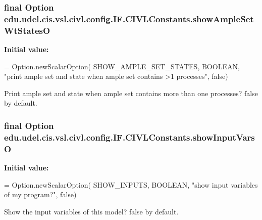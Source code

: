 \subsubsection[{show\+Ample\+Set\+Wt\+States\+O}]{\setlength{\rightskip}{0pt plus 5cm}final Option edu.\+udel.\+cis.\+vsl.\+civl.\+config.\+I\+F.\+C\+I\+V\+L\+Constants.\+show\+Ample\+Set\+Wt\+States\+O\hspace{0.3cm}{\ttfamily [static]}}\label{classedu_1_1udel_1_1cis_1_1vsl_1_1civl_1_1config_1_1IF_1_1CIVLConstants_af4bda824bd19eb7b681e4cdf2bcea519}
{\bfseries Initial value\+:}
\begin{DoxyCode}
= Option.newScalarOption(
            SHOW\_AMPLE\_SET\_STATES, BOOLEAN,
            \textcolor{stringliteral}{"print ample set and state when ample set contains >1 processes"},
            \textcolor{keyword}{false})
\end{DoxyCode}


Print ample set and state when ample set contains more than one processes? false by default. 

\hypertarget{classedu_1_1udel_1_1cis_1_1vsl_1_1civl_1_1config_1_1IF_1_1CIVLConstants_a01471f8516575754f52009463f995e99}{}
\subsubsection[{show\+Input\+Vars\+O}]{\setlength{\rightskip}{0pt plus 5cm}final Option edu.\+udel.\+cis.\+vsl.\+civl.\+config.\+I\+F.\+C\+I\+V\+L\+Constants.\+show\+Input\+Vars\+O\hspace{0.3cm}{\ttfamily [static]}}\label{classedu_1_1udel_1_1cis_1_1vsl_1_1civl_1_1config_1_1IF_1_1CIVLConstants_a01471f8516575754f52009463f995e99}
{\bfseries Initial value\+:}
\begin{DoxyCode}
= Option.newScalarOption(
            SHOW\_INPUTS, BOOLEAN, \textcolor{stringliteral}{"show input variables of my program?"}, \textcolor{keyword}{false})
\end{DoxyCode}


Show the input variables of this model? false by default. 

